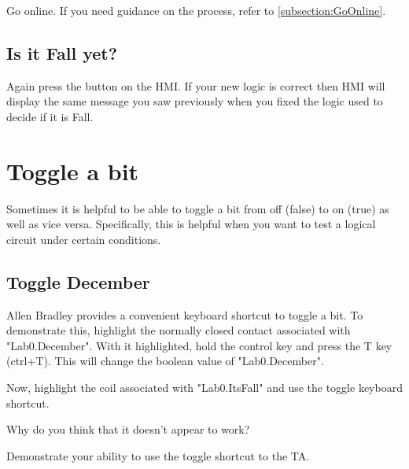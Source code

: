 Go online. If you need guidance on the process, refer to \sectionautorefname \ref{subsection:GoOnline}.

\subsection{Is it Fall yet?}

Again press the button on the HMI. If your new logic is correct then HMI will display the same message you saw previously when you fixed the logic used to decide if it is Fall.

\TASignatureSlot


\section{Toggle a bit}

Sometimes it is helpful to be able to toggle a bit from off (false) to on (true) as well as vice versa. Specifically, this is helpful when you want to test a logical circuit under certain conditions.

\subsection{Toggle December}

Allen Bradley provides a convenient keyboard shortcut to toggle a bit. To demonstrate this, highlight the normally closed contact associated with "Lab0.December". With it highlighted, hold the control key and press the T key (ctrl+T). This will change the boolean value of "Lab0.December".

Now, highlight the coil associated with "Lab0.Its\textunderscore Fall" and use the toggle keyboard shortcut.

Why do you think that it doesn't appear to work?


Demonstrate your ability to use the toggle shortcut to the TA.

\TASignatureSlot